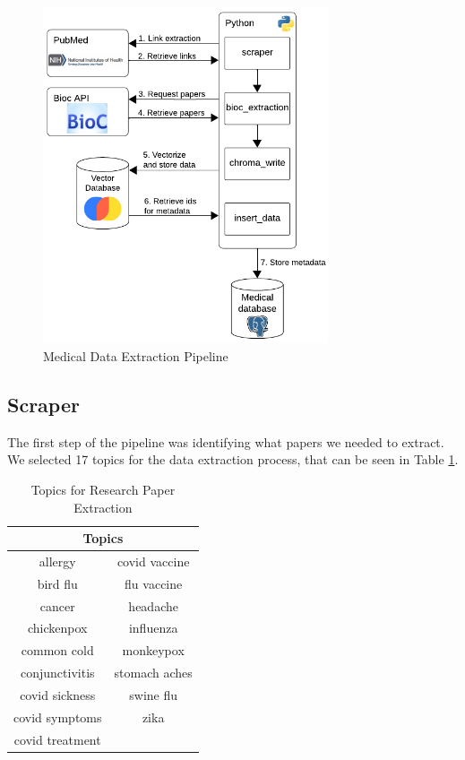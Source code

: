 \begin{figure}[H]
	\begin{center}
		\includegraphics[width=0.75\textwidth]{images/ETL_Pipeline.png} %
	\end{center}
	\caption{Medical Data Extraction Pipeline} %
	\label{fig:etl}
\end{figure}

\subsection{Scraper}
The first step of the pipeline was identifying what papers we needed to extract. We selected 17 topics for the data extraction process, that can be seen in Table \ref{table:topics}.

\begin{table}[!ht]
	\centering
	\caption{Topics for Research Paper Extraction}
	\begin{tabular}{||c | c||} 
			\hline
			 \multicolumn{2}{||c||}{\textbf{Topics}} \\ [1.5ex] 
			\hline
			allergy  & covid vaccine \\ [1ex]
			\hline
			bird flu & flu vaccine \\ [1ex]
			\hline
			cancer & headache \\ [1ex]
			\hline
			chickenpox & influenza\\ [1ex]
			\hline
			common cold & monkeypox \\ [1ex]
			\hline
			conjunctivitis & stomach aches \\ [1ex]
			\hline
			covid sickness & swine flu \\ [1ex]
			\hline
			covid symptoms & zika\\ [1ex]
			\hline
			covid treatment &  \\ [1ex]
			\hline
			\end{tabular}
	\label{table:topics}
\end{table}


